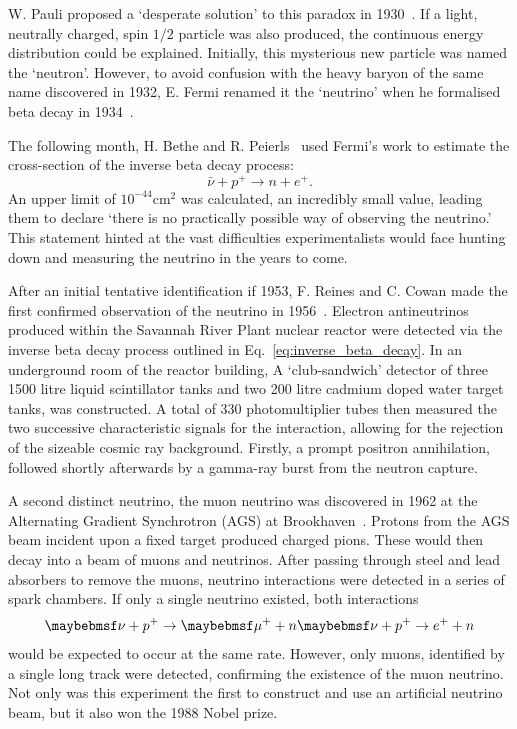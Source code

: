 W. Pauli proposed a `desperate solution' to this paradox in 1930~\cite{pauli1930}. If a light,
neutrally charged, spin $1/2$ particle was also produced, the continuous energy distribution could
be explained. Initially, this mysterious new particle was named the `neutron'. However, to avoid
confusion with the heavy baryon of the same name discovered in 1932, E. Fermi renamed it the
`neutrino' when he formalised beta decay in 1934~\cite{fermi1934}.

The following month, H. Bethe and R. Peierls~\cite{bethe1934} used Fermi's work to estimate the
cross-section of the inverse beta decay process:
\begin{equation} %
    \bar{\nu} + p^{+} \rightarrow n + e^{+}.
    \label{eq:inverse_beta_decay}
\end{equation} %
An upper limit of $10^{-44} \mathrm{cm}^2$ was calculated, an incredibly small value, leading them to
declare `there is no practically possible way of observing the neutrino.' This statement hinted at
the vast difficulties experimentalists would face hunting down and measuring the neutrino in the
years to come.

After an initial tentative identification if 1953, F. Reines and C. Cowan made the first confirmed
observation of the neutrino in 1956~\cite{cowan1956}. Electron antineutrinos produced within the
Savannah River Plant nuclear reactor were detected via the inverse beta decay process outlined in
Eq.~\ref{eq:inverse_beta_decay}. In an underground room of the reactor building, A
`club-sandwich' detector of three 1500 litre liquid scintillator tanks and two 200 litre cadmium
doped water target tanks, was constructed. A total of 330 photomultiplier tubes then measured the
two successive characteristic signals for the interaction, allowing for the rejection of the
sizeable cosmic ray background. Firstly, a prompt positron annihilation, followed shortly
afterwards by a gamma-ray burst from the neutron capture.

A second distinct neutrino, the muon neutrino was discovered in 1962 at the Alternating Gradient
Synchrotron (AGS) at Brookhaven~\cite{danby1962}. Protons from the AGS beam incident upon a fixed
target produced charged pions. These would then decay into a beam of muons and neutrinos. After
passing through steel and lead absorbers to remove the muons, neutrino interactions were detected
in a series of spark chambers. If only a single neutrino existed, both interactions
\begin{equation} %
    \nu+p^{+}\rightarrow\mu^{+}+n \\
    \nu+p^{+}\rightarrow e^{+}+n
\end{equation} %
would be expected to occur at the same rate. However, only muons, identified by a single long
track were detected, confirming the existence of the muon neutrino. Not only was this experiment
the first to construct and use an artificial neutrino beam, but it also won the 1988 Nobel prize.

